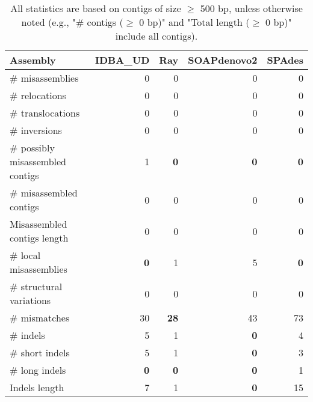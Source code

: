 \documentclass[12pt,a4paper]{article}
\begin{document}
\begin{table}[ht]
\begin{center}
\caption{All statistics are based on contigs of size $\geq$ 500 bp, unless otherwise noted (e.g., "\# contigs ($\geq$ 0 bp)" and "Total length ($\geq$ 0 bp)" include all contigs).}
\begin{tabular}{|l*{4}{|r}|}
\hline
Assembly & IDBA\_UD & Ray & SOAPdenovo2 & SPAdes \\ \hline
\# misassemblies & 0 & 0 & 0 & 0 \\ \hline
\hspace{5mm}\# relocations & 0 & 0 & 0 & 0 \\ \hline
\hspace{5mm}\# translocations & 0 & 0 & 0 & 0 \\ \hline
\hspace{5mm}\# inversions & 0 & 0 & 0 & 0 \\ \hline
\# possibly misassembled contigs & 1 & {\bf 0} & {\bf 0} & {\bf 0} \\ \hline
\# misassembled contigs & 0 & 0 & 0 & 0 \\ \hline
Misassembled contigs length & 0 & 0 & 0 & 0 \\ \hline
\# local misassemblies & {\bf 0} & 1 & 5 & {\bf 0} \\ \hline
\# structural variations & 0 & 0 & 0 & 0 \\ \hline
\# mismatches & 30 & {\bf 28} & 43 & 73 \\ \hline
\# indels & 5 & 1 & {\bf 0} & 4 \\ \hline
\hspace{5mm}\# short indels & 5 & 1 & {\bf 0} & 3 \\ \hline
\hspace{5mm}\# long indels & {\bf 0} & {\bf 0} & {\bf 0} & 1 \\ \hline
Indels length & 7 & 1 & {\bf 0} & 15 \\ \hline
\end{tabular}
\end{center}
\end{table}
\end{document}
